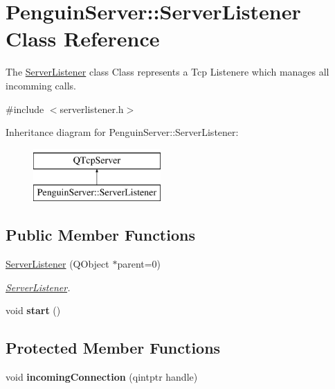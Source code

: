 \hypertarget{classPenguinServer_1_1ServerListener}{\section{Penguin\-Server\-:\-:Server\-Listener Class Reference}
\label{classPenguinServer_1_1ServerListener}
}


The \hyperlink{classPenguinServer_1_1ServerListener}{Server\-Listener} class Class represents a Tcp Listenere which manages all incomming calls.  




{\ttfamily \#include $<$serverlistener.\-h$>$}

Inheritance diagram for Penguin\-Server\-:\-:Server\-Listener\-:\begin{figure}[H]
\begin{center}
\leavevmode
\includegraphics[height=2.000000cm]{classPenguinServer_1_1ServerListener}
\end{center}
\end{figure}
\subsection*{Public Member Functions}
\begin{DoxyCompactItemize}
\item 
\hyperlink{classPenguinServer_1_1ServerListener_a50619f2b21ddf6a4b6d534f984be2323}{Server\-Listener} (Q\-Object $\ast$parent=0)
\begin{DoxyCompactList}\small\item\em \hyperlink{classPenguinServer_1_1ServerListener}{Server\-Listener}. \end{DoxyCompactList}\item 
\hypertarget{classPenguinServer_1_1ServerListener_a070db48538948282b6cc6a0a2eb7682e}{void {\bfseries start} ()}\label{classPenguinServer_1_1ServerListener_a070db48538948282b6cc6a0a2eb7682e}

\end{DoxyCompactItemize}
\subsection*{Protected Member Functions}
\begin{DoxyCompactItemize}
\item 
\hypertarget{classPenguinServer_1_1ServerListener_acf6d1127a2f9e121b24fae142a4070f5}{void {\bfseries incoming\-Connection} (qintptr handle)}\label{classPenguinServer_1_1ServerListener_acf6d1127a2f9e121b24fae142a4070f5}

\end{DoxyCompactItemize}


